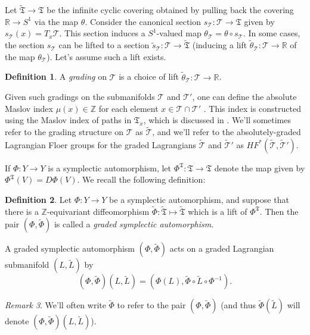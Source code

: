 \documentclass[11pt]{article}
\theoremstyle{plain} \newtheorem{thm}{Theorem}[subsection]
\theoremstyle{plain} \newtheorem{cor}[thm]{Corollary}
\theoremstyle{plain} \newtheorem{prop}[thm]{Proposition}
\theoremstyle{plain} \newtheorem{conj}[thm]{Conjecture}
\theoremstyle{plain} \newtheorem{lem}[thm]{Lemma}
\theoremstyle{definition} \newtheorem{df}[thm]{Definition}
\theoremstyle{remark} \newtheorem{rmk}[thm]{Remark}
\theoremstyle{remark} \newtheorem{obs}[thm]{Observation}
\newcommand{\tld}[1]{\widetilde{#1}}
\begin{document}
Let $\tld{\mathfrak{T}} \rightarrow \mathfrak{T}$ be the infinite cyclic covering obtained by pulling back the covering $\mathbb{R} \rightarrow S^{1}$ via the map $\theta$.  Consider the canonical section $s_{\mathcal{T}}: \mathcal{T} \rightarrow \mathfrak{T}$ given by $s_{\mathcal{T}}(x) = T_{x}\mathcal{T}$.  This section induces a $S^{1}$-valued map $\theta_{\mathcal{T}} = \theta \circ s_{\mathcal{T}}$.  In some cases, the section $s_{\mathcal{T}}$ can be lifted to a section $\tld{s}_{\mathcal{T}}: \mathcal{T} \rightarrow \tld{\mathfrak{T}}$ (inducing a lift $\tld{\theta}_{\mathcal{T}} :\mathcal{T} \rightarrow \mathbb{R}$ of the map $\theta_{\mathcal{T}}$).  Let's assume such a lift exists.

\begin{df}
A \textit{grading} on $\mathcal{T}$ is a choice of lift $\tld{\theta}_{\mathcal{T}}: \mathcal{T} \rightarrow \mathbb{R}$.
\end{df}
Given such gradings on the submanifolds $\mathcal{T}$ and $\mathcal{T}'$, one can define the absolute Maslov index $\mu(x) \in \mathbb{Z}$ for each element $x \in \mathcal{T} \cap \mathcal{T}'$ \cite{s:GL}.  This index is constructed using the Maslov index of paths in $\mathfrak{T}_{x}$, which is discussed in \cite{rs:paths}.  We'll sometimes refer to the grading structure on $\mathcal{T}$ as $\tld{\mathcal{T}}$, and we'll refer to the absolutely-graded Lagrangian Floer groups for the graded Lagrangians $\tld{\mathcal{T}}$ and $\tld{\mathcal{T}}'$ as $HF^{*}(\tld{\mathcal{T}}, \tld{\mathcal{T}}').$

If $\Phi: Y \rightarrow Y$ is a symplectic automorphism, let $\Phi^{\mathfrak{T}}: \mathfrak{T} \rightarrow \mathfrak{T}$ denote the map given by  $\Phi^{\mathfrak{T}}(V) = D\Phi(V)$.  We recall the following definition:

\begin{df}
Let $\Phi: Y \rightarrow Y$ be a symplectic automorphism, and suppose that there is a $\mathbb{Z}$-equivariant diffeomorphism $\tld{\Phi}: \tld{\mathfrak{T}} \mapsto \tld{\mathfrak{T}}$ which is a lift of $\Phi^{\mathfrak{T}}$.  Then the pair $(\Phi, \tld{\Phi})$ is called a \textit{graded symplectic automorphism}.
\end{df}
A graded symplectic automorphism $(\Phi, \tld{\Phi})$ acts on a graded Lagrangian submanifold $(L, \tld{L})$ by
$$ (\Phi, \tld{\Phi})(L, \tld{L}) = ( \Phi(L),  \tld{\Phi} \circ \tld{L} \circ \Phi^{-1}).$$
\begin{rmk}
We'll often write $\tld{\Phi}$ to refer to the pair $(\Phi, \tld{\Phi})$ (and thus $\tld{\Phi}(\tld{L})$ will denote $(\Phi, \tld{\Phi})(L, \tld{L})$).
\end{rmk}
\end{document}
